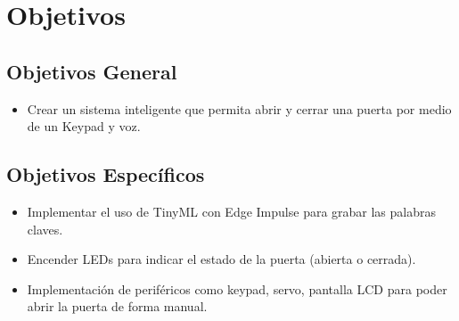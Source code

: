 \section{Objetivos}
\subsection{Objetivos General}
\begin{itemize}
\item Crear un sistema inteligente que permita abrir y cerrar una puerta por medio de un Keypad y voz.

\end{itemize}

\subsection{Objetivos Específicos}
\begin{itemize}
\item Implementar el uso de TinyML con Edge Impulse para grabar las palabras claves.
\item Encender LEDs para indicar el estado de la puerta (abierta o cerrada).
\item Implementación de periféricos como keypad, servo, pantalla LCD para poder abrir la puerta de forma manual.
\end{itemize} 
\newpage
